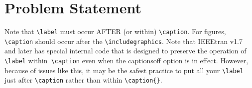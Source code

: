 \section{Problem Statement}
Note that \verb|\label| must occur AFTER (or within) \verb|\caption|. For figures, \verb|\caption| should occur after the \verb|\includegraphics|. Note that IEEEtran v1.7 and later has special internal code that is designed to preserve the operation of \verb|\label| within\verb| \caption| even when the captionsoff option is in effect. However, because
of issues like this, it may be the safest practice to put all your \verb|\label| just after \verb|\caption| rather than within \verb|\caption{}|.